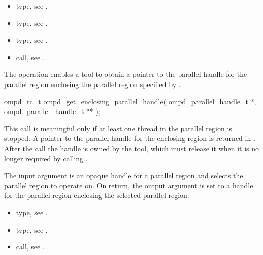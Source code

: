 \crossreferences
\begin{itemize}
	\item {} type, see .
	\item {} type, see .
	\item {} type, see .
	\item {} call, see 
	.
\end{itemize}

\label{subsubsubsec:ompd_get_enclosing_parallel_handle}
\summary
The    operation enables a tool to obtain a
pointer to the parallel handle for the parallel region enclosing the parallel region specified by
.

\format

\begin{cspecific}
\begin{ompSyntax}
ompd_rc_t ompd_get_enclosing_parallel_handle(
  ompd_parallel_handle_t *,
  ompd_parallel_handle_t **
);
\end{ompSyntax}
\end{cspecific}


\descr
This call is meaningful only if at least one thread in the parallel region is stopped.
A pointer to the parallel handle for the enclosing region is returned in
. After the call the handle is owned by the tool, which must
release it when it is no longer required by calling .

\argdesc
The input argument  is an opaque handle for a parallel region and selects the parallel region to operate on.
On return, the output argument  is set to a handle for the parallel region
enclosing the selected parallel region.

\crossreferences
\begin{itemize}
	\item {} type, see 
	.
	\item {} type, see .
	\item {} call, see 
	.
\end{itemize}

